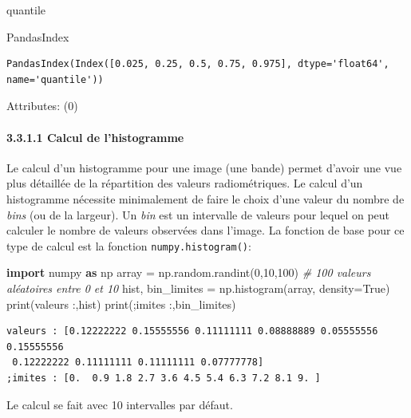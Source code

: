 \documentclass[
]{article}
\newenvironment{Shaded}{}{}
\newcommand{\BuiltInTok}[1]{\textcolor[rgb]{0.00,0.50,0.00}{#1}}
\newcommand{\CommentTok}[1]{\textcolor[rgb]{0.38,0.63,0.69}{\textit{#1}}}
\newcommand{\DecValTok}[1]{\textcolor[rgb]{0.25,0.63,0.44}{#1}}
\newcommand{\ImportTok}[1]{\textcolor[rgb]{0.00,0.50,0.00}{\textbf{#1}}}
\newcommand{\NormalTok}[1]{#1}
\newcommand{\OperatorTok}[1]{\textcolor[rgb]{0.40,0.40,0.40}{#1}}
\newcommand{\StringTok}[1]{\textcolor[rgb]{0.25,0.44,0.63}{#1}}
\newcommand{\VariableTok}[1]{\textcolor[rgb]{0.10,0.09,0.49}{#1}}
\begin{document}
quantile

PandasIndex

\begin{verbatim}
PandasIndex(Index([0.025, 0.25, 0.5, 0.75, 0.975], dtype='float64', name='quantile'))
\end{verbatim}

Attributes: {(0)}

\paragraph{\texorpdfstring{{3.3.1.1} Calcul de
l'histogramme}{3.3.1.1 Calcul de l'histogramme}}\label{calcul-de-lhistogramme}

Le calcul d'un histogramme pour une image (une bande) permet d'avoir une
vue plus détaillée de la répartition des valeurs radiométriques. Le
calcul d'un histogramme nécessite minimalement de faire le choix d'une
valeur du nombre de \emph{bins} (ou de la largeur). Un \emph{bin} est un
intervalle de valeurs pour lequel on peut calculer le nombre de valeurs
observées dans l'image. La fonction de base pour ce type de calcul est
la fonction \texttt{numpy.histogram()}:

\label{a70bd3e0}
\label{cb15}
\begin{Shaded}
\begin{Highlighting}[]
\ImportTok{import}\NormalTok{ numpy }\ImportTok{as}\NormalTok{ np}
\NormalTok{array }\OperatorTok{=}\NormalTok{ np.random.randint(}\DecValTok{0}\NormalTok{,}\DecValTok{10}\NormalTok{,}\DecValTok{100}\NormalTok{) }\CommentTok{\# 100 valeurs aléatoires entre 0 et 10}
\NormalTok{hist, bin\_limites }\OperatorTok{=}\NormalTok{ np.histogram(array, density}\OperatorTok{=}\VariableTok{True}\NormalTok{)}
\BuiltInTok{print}\NormalTok{(}\StringTok{\textquotesingle{}valeurs :\textquotesingle{}}\NormalTok{,hist)}
\BuiltInTok{print}\NormalTok{(}\StringTok{\textquotesingle{};imites :\textquotesingle{}}\NormalTok{,bin\_limites)}
\end{Highlighting}
\end{Shaded}

\begin{verbatim}
valeurs : [0.12222222 0.15555556 0.11111111 0.08888889 0.05555556 0.15555556
 0.12222222 0.11111111 0.11111111 0.07777778]
;imites : [0.  0.9 1.8 2.7 3.6 4.5 5.4 6.3 7.2 8.1 9. ]
\end{verbatim}

Le calcul se fait avec 10 intervalles par défaut.
\end{document}
